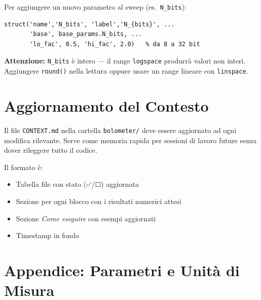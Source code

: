 \documentclass[11pt,a4paper]{article}
\begin{document}
Per aggiungere un nuovo parametro al sweep (es.\ \texttt{N\_bits}):

\begin{lstlisting}[caption={Aggiungere N\_bits al sweep in sensitivity\_analysis.m}]
% nel vettore sweep_defs:
struct('name','N_bits', 'label','N_{bits}', ...
       'base', base_params.N_bits, ...
       'lo_fac', 0.5, 'hi_fac', 2.0)   % da 8 a 32 bit
\end{lstlisting}

\begin{warnbox}
\textbf{Attenzione:} \texttt{N\_bits} è intero --- il range \texttt{logspace}
produrrà valori non interi. Aggiungere \texttt{round()} nella lettura
oppure usare un range lineare con \texttt{linspace}.
\end{warnbox}

\section{Aggiornamento del Contesto}

Il file \texttt{CONTEXT.md} nella cartella \texttt{bolometer/} deve essere
aggiornato ad ogni modifica rilevante. Serve come memoria rapida per
sessioni di lavoro future senza dover rileggere tutto il codice.

Il formato è:
\begin{itemize}[noitemsep]
  \item Tabella file con stato (\texttt{✅}/\texttt{⬜}) aggiornata
  \item Sezione per ogni blocco con i risultati numerici attesi
  \item Sezione \emph{Come eseguire} con esempi aggiornati
  \item Timestamp in fondo
\end{itemize}

\section*{Appendice: Parametri e Unità di Misura}
\end{document}
